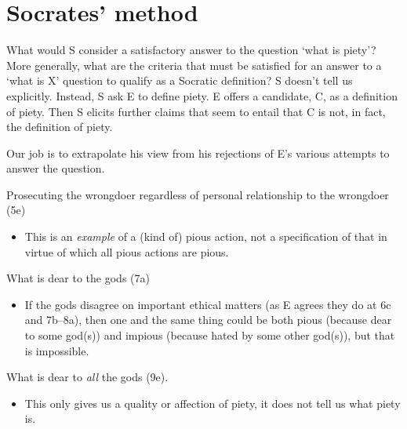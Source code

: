 \documentclass[oneside]{article}
\begin{document}


\section*{Socrates' method}
 What would S consider a satisfactory answer to the question `what is piety'? More generally, what are the criteria that must be satisfied for an answer to a `what is X' question to qualify as a Socratic definition? S doesn't tell us explicitly. Instead,  S ask E to define piety. E offers a candidate, C, as a definition of piety. Then S elicits further claims that seem to entail that C is not, in fact, the definition of piety. 
 
Our job is to extrapolate his view from his rejections of E's various attempts to answer the question.


\item Prosecuting the wrongdoer regardless of personal relationship to the wrongdoer (5e)

\begin{itemize}\item{This is an \emph{example} of a (kind of) pious action, not a specification of that in virtue of which all pious actions are pious.}\end{itemize}

\item{What is dear to the gods (7a)}

\begin{itemize}\item{If the gods disagree on important ethical matters (as E agrees they do at 6c and 7b--8a), then one and the same thing could be both pious (because dear to some god(s)) and impious (because hated by some other god(s)), but that is impossible.}\end{itemize}

\item{What is dear to \emph{all} the gods (9e).}

\begin{itemize}\item{This only gives us a quality or affection of piety, it does not tell us what piety is.}\end{itemize}
\end{document}
